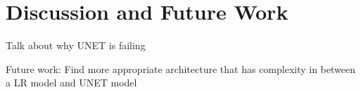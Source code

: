 \section{Discussion and Future Work}

Talk about why UNET is failing

Future work: Find more appropriate architecture that has complexity in between a LR model and UNET model